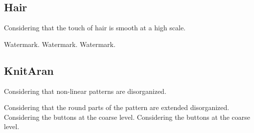 \documentclass[12pt,a4paper]{article}
\begin{document}
\begin{singlespace}
\clearpage
\renewcommand{\mat}{Hair}
\subsection{\mat}
Considering that the touch of hair is smooth at a high scale.

\renewcommand{\Number}{01}\InputImage{\sexor}{\tbu}{\sexor}{\tsm}{\sexdi}{\tsm}
{Watermark.}{}
\renewcommand{\Number}{02}\InputImage{\sexor}{\tbu}{\sexdi}{\tsm}{\sexdi}{\tsm}
{Watermark.}{}
\renewcommand{\Number}{03}\InputImage{\sexor}{\tbu}{\sexor}{\tsm}{\sexdi}{\tsm}
{}{}
\renewcommand{\Number}{04}\InputImage{\sexor}{\tbu}{\sexor}{\tsm}{\sexdi}{\tsm}
{}{}
\renewcommand{\Number}{05}\InputImage{\sexor}{\tbu}{\sexor}{\tsm}{\sexor}{\tsm}
{}{}
\renewcommand{\Number}{06}\InputImage{\sexor}{\tbu}{\sexor}{\tsm}{\sexor}{\tsm}
{}{}
\renewcommand{\Number}{07}\InputImage{\sexor}{\tbu}{\sexor}{\tsm}{\sexdi}{\tsm}
{}{}
\renewcommand{\Number}{08}\InputImage{\sexor}{\tbu}{\sexdi}{\tsm}{\sexdi}{\tsm}
{}{}
\renewcommand{\Number}{09}\InputImage{\sexor}{\tbu}{\sexor}{\tsm}{\sexdi}{\tsm}
{}{}
\renewcommand{\Number}{10}\InputImage{\sexor}{\tbu}{\sexor}{\tsm}{\sexdi}{\tsm}
{Watermark.}{}
\renewcommand{\Number}{11}\InputImage{\sexor}{\tbu}{\sexor}{\tsm}{\sexor}{\tsm}
{}{}
\renewcommand{\Number}{12}\InputImage{\sexor}{\tbu}{\sexor}{\tsm}{\sexdi}{\tsm}
{}{}

\clearpage
\renewcommand{\mat}{KnitAran}
\subsection{\mat}
Considering that non-linear patterns are disorganized.

\renewcommand{\Number}{01}\InputImage{\sexor}{\tco}{\sexdi}{\tbu}{\sexdi}{\tbu}
{}{}
\renewcommand{\Number}{02}\InputImage{\sexdi}{\tco}{\sexdi}{\tbu}{\sexdi}{\tbu}
{}{}
\renewcommand{\Number}{03}\InputImage{\sexor}{\tco}{\sexdi}{\tbu}{\sexdi}{\tbu}
{}{Considering that the round parts of the pattern are extended disorganized.}
\renewcommand{\Number}{04}\InputImage{\sexor}{\tco}{\sexdi}{\tbu}{\sro}{\tbu}
{}{Considering the buttons at the coarse level.}
\renewcommand{\Number}{05}\InputImage{\sexor}{\tco}{\sexdi}{\tbu}{\sro}{\tbu}
{}{}
\renewcommand{\Number}{06}\InputImage{\sexor}{\tco}{\sexdi}{\tbu}{\sro}{\tbu}
{}{}
\renewcommand{\Number}{07}\InputImage{\sexor}{\tco}{\sexor}{\tco}{\sexdi}{\tbu}
{}{}
\renewcommand{\Number}{08}\InputImage{\sexdi}{\tco}{\sexdi}{\tco}{\sexdi}{\tbu}
{}{}
\renewcommand{\Number}{09}\InputImage{\sexor}{\tco}{\sexdi}{\tbu}{\sexdi}{\tbu}
{}{}
\renewcommand{\Number}{10}\InputImage{\sexor}{\tco}{\sexor}{\tco}{\sexdi}{\tbu}
{}{}
\renewcommand{\Number}{11}\InputImage{\sexor}{\tco}{\sexdi}{\tbu}{\sro}{\tbu}
{}{Considering the buttons at the coarse level.}
\renewcommand{\Number}{12}\InputImage{\sexor}{\tco}{\sexdi}{\tbu}{\sexdi}{\tbu}
{}{}


\end{singlespace}
\end{document}
